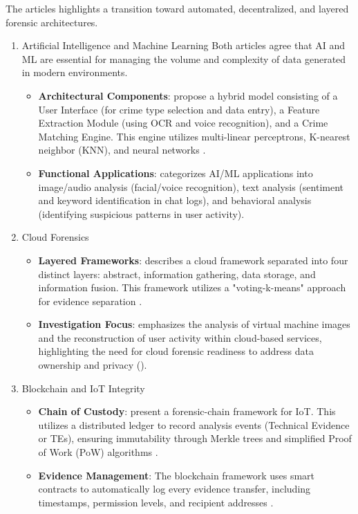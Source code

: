 \documentclass[12pt,a4paper]{article}
\begin{document}
The articles highlights a transition toward automated, decentralized, and layered forensic architectures.
\begin{enumerate}
\item Artificial Intelligence and Machine Learning
Both articles agree that AI and ML are essential for managing the volume and complexity of data generated in modern environments.
\begin{itemize}
    
\item \textbf{Architectural Components}: \cite{vaddi2024enhancements} propose a hybrid model consisting of a User Interface (for crime type selection and data entry), a Feature Extraction Module (using OCR and voice recognition), and a Crime Matching Engine. This engine utilizes multi-linear perceptrons, K-nearest neighbor (KNN), and neural networks \cite{vaddi2024enhancements}.
\item \textbf{Functional Applications}: \cite{alenezi2023digital} categorizes AI/ML applications into image/audio analysis (facial/voice recognition), text analysis (sentiment and keyword identification in chat logs), and behavioral analysis (identifying suspicious patterns in user activity).
\end{itemize}

\item Cloud Forensics
\begin{itemize}
\item \textbf{Layered Frameworks}: \cite{vaddi2024enhancements} describes a cloud framework separated into four distinct layers: abstract, information gathering, data storage, and information fusion. This framework utilizes a "voting-k-means" approach for evidence separation \cite{vaddi2024enhancements}.
\item \textbf{Investigation Focus}: \cite{alenezi2023digital} emphasizes the analysis of virtual machine images and the reconstruction of user activity within cloud-based services, highlighting the need for cloud forensic readiness to address data ownership and privacy (\cite{alenezi2023digital}).
\end{itemize}

\item Blockchain and IoT Integrity
\begin{itemize}
\item \textbf{Chain of Custody}: \cite{vaddi2024enhancements} present a forensic-chain framework for IoT. This utilizes a distributed ledger to record analysis events (Technical Evidence or TEs), ensuring immutability through Merkle trees and simplified Proof of Work (PoW) algorithms \cite{vaddi2024enhancements}.
\item \textbf{Evidence Management}: The blockchain framework uses smart contracts to automatically log every evidence transfer, including timestamps, permission levels, and recipient addresses \cite{vaddi2024enhancements}.
\end{itemize}


\end{enumerate}
\end{document}
